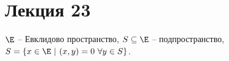 \section*{Лекция 23}
%

$\E$ -- Евклидово пространство, $S \subseteq \E$ -- подпространство, $S = \{x \in \E\ |\ (x, y) = 0\ \forall y \in S\}$.


